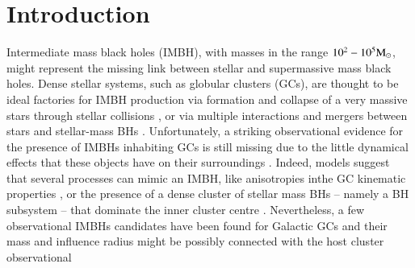 \documentclass[article]{aa}
\newcommand{\Ms}{{\rm M}_\odot}
\begin{document}

\maketitle
%

\section{Introduction}

Intermediate mass black holes (IMBH), with masses in the range $10^2-10^5\Ms$, might represent the missing link between stellar and supermassive mass black holes. Dense stellar systems, such as globular clusters (GCs), are thought to be ideal factories for IMBH production via formation and collapse of a very massive stars through stellar collisions \citep{zwart02, freitag06b,freitag06c, giersz15, mapelli16},
or via multiple interactions and mergers between stars and stellar-mass BHs \citep{giersz15}. Unfortunately, a striking observational evidence for the presence of IMBHs inhabiting GCs is still missing due to the little dynamical effects that these objects have on their surroundings \citep[for recent reviews see][]{mezcua17,greene19}. Indeed, models suggest that several processes can mimic an IMBH, like anisotropies inthe GC kinematic  properties \citep{zocchi}, or the presence of a dense cluster of stellar mass BHs -- namely a BH subsystem -- that dominate the inner cluster centre \citep{AAG18b,AS16,vandermarel10}. Nevertheless, a few observational IMBHs candidates have been found for Galactic GCs
\citep{noyola10,lu13,lanzoni13,kiziltan17} and their mass and influence radius might be possibly connected with the host cluster observational 
\end{document}
